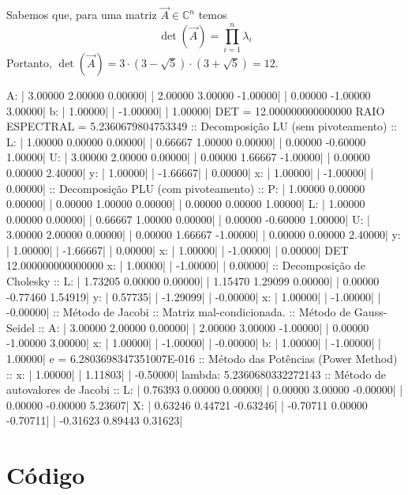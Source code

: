 \documentclass{homework}
\begin{document}
		\subsubquest Sabemos que, para uma matriz $\vec{A} \in \mathbb{C}^n$ temos $$\det\left(\vec{A}\right) = \prod_{i=1}^{n} \lambda_i$$
		Portanto, $\det\left(\vec{A}\right) = 3 \cdot (3 - \sqrt{5}) \cdot (3 + \sqrt{5}) = 12$.\par
		
	\quest%
	
	\begin{fortran}
	 A:
	|   3.00000    2.00000    0.00000|
	|   2.00000    3.00000   -1.00000|
	|   0.00000   -1.00000    3.00000|
	b:
	|   1.00000|
	|  -1.00000|
	|   1.00000|
	DET =   12.000000000000000     
	RAIO ESPECTRAL =   5.2360679804753349     
	:: Decomposição LU (sem pivoteamento) ::
	L:
	|   1.00000    0.00000    0.00000|
	|   0.66667    1.00000    0.00000|
	|   0.00000   -0.60000    1.00000|
	U:
	|   3.00000    2.00000    0.00000|
	|   0.00000    1.66667   -1.00000|
	|   0.00000    0.00000    2.40000|
	y:
	|   1.00000|
	|  -1.66667|
	|   0.00000|
	x:
	|   1.00000|
	|  -1.00000|
	|   0.00000|
	:: Decomposição PLU (com pivoteamento) ::
	P:
	|   1.00000    0.00000    0.00000|
	|   0.00000    1.00000    0.00000|
	|   0.00000    0.00000    1.00000|
	L:
	|   1.00000    0.00000    0.00000|
	|   0.66667    1.00000    0.00000|
	|   0.00000   -0.60000    1.00000|
	U:
	|   3.00000    2.00000    0.00000|
	|   0.00000    1.66667   -1.00000|
	|   0.00000    0.00000    2.40000|
	y:
	|   1.00000|
	|  -1.66667|
	|   0.00000|
	x:
	|   1.00000|
	|  -1.00000|
	|   0.00000|
	DET
	12.000000000000000     
	x:
	|   1.00000|
	|  -1.00000|
	|   0.00000|
	:: Decomposição de Cholesky ::
	L:
	|   1.73205    0.00000    0.00000|
	|   1.15470    1.29099    0.00000|
	|   0.00000   -0.77460    1.54919|
	y:
	|   0.57735|
	|  -1.29099|
	|  -0.00000|
	x:
	|   1.00000|
	|  -1.00000|
	|  -0.00000|
	:: Método de Jacobi ::
	Matriz mal-condicionada.
	:: Método de Gauss-Seidel ::
	A:
	|   3.00000    2.00000    0.00000|
	|   2.00000    3.00000   -1.00000|
	|   0.00000   -1.00000    3.00000|
	x:
	|   1.00000|
	|  -1.00000|
	|  -0.00000|
	b:
	|   1.00000|
	|  -1.00000|
	|   1.00000|
	e =    6.2803698347351007E-016
	:: Método das Potências (Power Method) ::
	x:
	|   1.00000|
	|   1.11803|
	|  -0.50000|
	lambda:
	5.2360680332272143     
	:: Método de autovalores de Jacobi ::
	L:
	|   0.76393    0.00000    0.00000|
	|   0.00000    3.00000   -0.00000|
	|   0.00000   -0.00000    5.23607|
	X:
	|   0.63246    0.44721   -0.63246|
	|  -0.70711    0.00000   -0.70711|
	|  -0.31623    0.89443    0.31623|
	\end{fortran}

	\pagebreak
	\appendixpage
	\appendix \section*{Código}
	
	
%		
\end{document}
